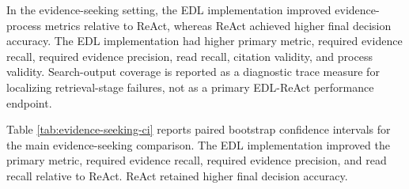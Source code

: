 \documentclass[11pt,a4paper]{article}
\begin{document}
In the evidence-seeking setting, the EDL implementation improved evidence-process metrics relative to ReAct, whereas ReAct achieved higher final decision accuracy. The EDL implementation had higher primary metric, required evidence recall, required evidence precision, read recall, citation validity, and process validity. Search-output coverage is reported as a diagnostic trace measure for localizing retrieval-stage failures, not as a primary EDL-ReAct performance endpoint.

\begin{table}[H]
\centering
\caption{Main evaluation results in the evidence-seeking setting.}
\end{table}

Table \ref{tab:evidence-seeking-ci} reports paired bootstrap confidence intervals for the main evidence-seeking comparison. The EDL implementation improved the primary metric, required evidence recall, required evidence precision, and read recall relative to ReAct. ReAct retained higher final decision accuracy.

\begin{table}[H]
\centering
\caption{Paired bootstrap confidence intervals for the evidence-seeking EDL-ReAct comparison. Differences are EDL minus ReAct.}
\label{tab:evidence-seeking-ci}
\end{table}
\end{document}

